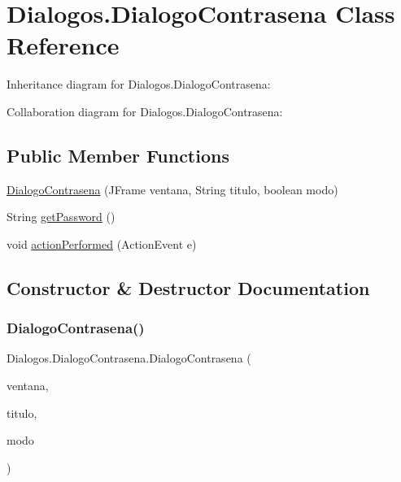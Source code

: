\hypertarget{class_dialogos_1_1_dialogo_contrasena}{}\section{Dialogos.\+Dialogo\+Contrasena Class Reference}
\label{class_dialogos_1_1_dialogo_contrasena}


Inheritance diagram for Dialogos.\+Dialogo\+Contrasena\+:


Collaboration diagram for Dialogos.\+Dialogo\+Contrasena\+:
\subsection*{Public Member Functions}
\begin{DoxyCompactItemize}
\item 
\mbox{\hyperlink{class_dialogos_1_1_dialogo_contrasena_a9a6b29752e63bf2be3f224eaf6fe3df8}{Dialogo\+Contrasena}} (J\+Frame ventana, String titulo, boolean modo)
\item 
String \mbox{\hyperlink{class_dialogos_1_1_dialogo_contrasena_abf0758452b6d0029f6f633a28b3449fd}{get\+Password}} ()
\item 
void \mbox{\hyperlink{class_dialogos_1_1_dialogo_contrasena_a062d6632b686a684e425754e346ae2d6}{action\+Performed}} (Action\+Event e)
\end{DoxyCompactItemize}


\subsection{Constructor \& Destructor Documentation}
\mbox{\label{class_dialogos_1_1_dialogo_contrasena_a9a6b29752e63bf2be3f224eaf6fe3df8}} 
\subsubsection{\texorpdfstring{Dialogo\+Contrasena()}{DialogoContrasena()}}
{\footnotesize\ttfamily Dialogos.\+Dialogo\+Contrasena.\+Dialogo\+Contrasena (\begin{DoxyParamCaption}\item[{J\+Frame}]{ventana,  }\item[{String}]{titulo,  }\item[{boolean}]{modo }\end{DoxyParamCaption})\hspace{0.3cm}{\ttfamily [inline]}}

